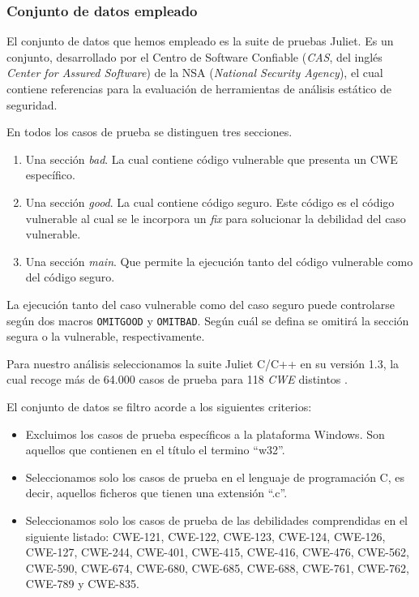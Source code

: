 \documentclass[12pt, a4paper, twoside]{article}
\begin{document}
\subsubsection{Conjunto de datos empleado}
El conjunto de datos que hemos empleado es la suite de pruebas Juliet. Es un conjunto, desarrollado por el Centro de Software Confiable (\textit{CAS}, del inglés \textit{Center for Assured Software}) de la NSA (\textit{National Security Agency}), el cual contiene referencias para la evaluación de herramientas de análisis estático de seguridad.

En todos los casos de prueba se distinguen tres secciones.
\begin{enumerate}
	\item Una sección \textit{bad}. La cual contiene código vulnerable que presenta un CWE específico.
	
	\item Una sección \textit{good}. La cual contiene código seguro. Este código es el código vulnerable al cual se le incorpora un \textit{fix} para solucionar la debilidad del caso vulnerable.
	
	\item Una sección \textit{main}. Que permite la ejecución tanto del código vulnerable como del código seguro.
\end{enumerate}

La ejecución tanto del caso vulnerable como del caso seguro puede controlarse según dos macros \texttt{OMITGOOD} y \texttt{OMITBAD}. Según cuál se defina se omitirá la sección segura o la vulnerable, respectivamente.

Para nuestro análisis seleccionamos la suite Juliet C/C++ en su versión 1.3, la cual recoge más de 64.000 casos de prueba para 118 \textit{CWE} distintos \cite{samate-nist}. 

El conjunto de datos se filtro acorde a los siguientes criterios:
\begin{itemize}
	\item Excluimos los casos de prueba específicos a la plataforma Windows. Son aquellos que contienen en el título el termino \enquote{w32}.
	\item Seleccionamos solo los casos de prueba en el lenguaje de programación C, es decir, aquellos ficheros que tienen una extensión \enquote{.c}.
	\item Seleccionamos solo los casos de prueba de las debilidades comprendidas en el siguiente listado: CWE-121, CWE-122, CWE-123, CWE-124, CWE-126, CWE-127, CWE-244, CWE-401, CWE-415, CWE-416, CWE-476, CWE-562, CWE-590, CWE-674, CWE-680, CWE-685, CWE-688, CWE-761, CWE-762, CWE-789 y CWE-835.
\end{itemize}
\end{document}
